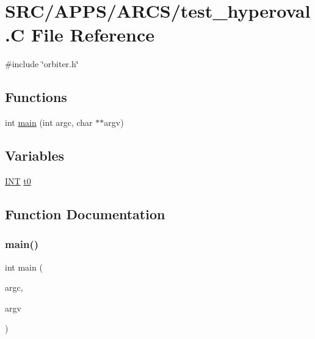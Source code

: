 \hypertarget{test__hyperoval_8_c}{}\section{S\+R\+C/\+A\+P\+P\+S/\+A\+R\+C\+S/test\+\_\+hyperoval.C File Reference}
\label{test__hyperoval_8_c}
{\ttfamily \#include \char`\"{}orbiter.\+h\char`\"{}}\newline
\subsection*{Functions}
\begin{DoxyCompactItemize}
\item 
int \mbox{\hyperlink{test__hyperoval_8_c_a3c04138a5bfe5d72780bb7e82a18e627}{main}} (int argc, char $\ast$$\ast$argv)
\end{DoxyCompactItemize}
\subsection*{Variables}
\begin{DoxyCompactItemize}
\item 
\mbox{\hyperlink{galois_8h_a09fddde158a3a20bd2dcadb609de11dc}{I\+NT}} \mbox{\hyperlink{test__hyperoval_8_c_a4268f4fe222ffb119218a0199f5e1904}{t0}}
\end{DoxyCompactItemize}


\subsection{Function Documentation}
\mbox{\label{test__hyperoval_8_c_a3c04138a5bfe5d72780bb7e82a18e627}} 
\subsubsection{\texorpdfstring{main()}{main()}}
{\footnotesize\ttfamily int main (\begin{DoxyParamCaption}\item[{int}]{argc,  }\item[{char $\ast$$\ast$}]{argv }\end{DoxyParamCaption})}



